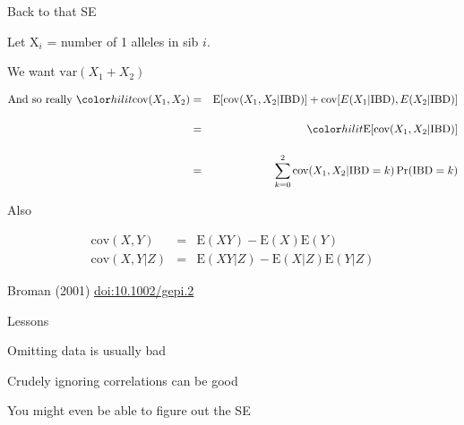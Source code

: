\documentclass[aspectratio=169,12pt,t]{beamer}
\begin{document}
\begin{frame}{Back to that SE}


  Let X$_i$ = number of 1 alleles in sib $i$.

  \bigskip

  We want $\text{var}(X_1 + X_2)$

  \bigskip

  \begin{eqnarray*}
  \text{And so really } {\hilit \text{cov}(X_1, X_2)} & = & \text{E}[\text{cov}(X_1, X_2 | \text{IBD})] + \text{cov}[E(X_1|\text{IBD}), E(X_2|\text{IBD})] \\[12pt]
   & = & {\hilit \text{E}[\text{cov}(X_1, X_2|\text{IBD})]} \\[12pt]
   & = & \sum_{k=0}^{2} \text{cov}(X_1, X_2|\text{IBD}=k) \, \text{Pr}(\text{IBD}=k)
   \end{eqnarray*}


\note{
}

\end{frame}



\begin{frame}{Also}

\bigskip

  \begin{eqnarray*}
    \text{cov}(X,Y) & = & \text{E}(XY) - \text{E}(X) \text{E}(Y) \\[24pt]
    \text{cov}(X,Y|Z) & = & \text{E}(XY|Z) - \text{E}(X|Z) \text{E}(Y|Z)
   \end{eqnarray*}


\note{
}

\end{frame}



\begin{frame}[c]{}


\vspace{3mm}

\hfill \footnotesize {\lolit Broman (2001)
  \href{https://doi.org/10.1002/gepi.2}{doi:10.1002/gepi.2}}


\note{
}

\end{frame}


\begin{frame}{Lessons}

  \bbi
  \itemsep36pt
\item Omitting data is usually bad
\item Crudely ignoring correlations can be good
  \bi
\item[] You might even be able to figure out the SE
  \ei
  \ei


\note{
}

  \end{frame}
\end{document}
